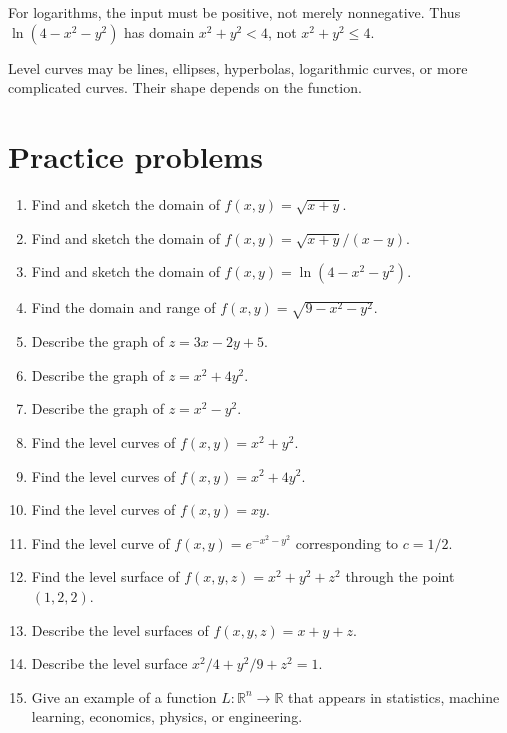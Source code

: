 \documentclass[11pt]{article}
\newcommand{\R}{\mathbb R}
\begin{document}
\begin{warningbox}
For logarithms, the input must be positive, not merely nonnegative. Thus $\ln(4-x^2-y^2)$ has domain $x^2+y^2<4$, not $x^2+y^2\le 4$.
\end{warningbox}

\begin{warningbox}
Level curves may be lines, ellipses, hyperbolas, logarithmic curves, or more complicated curves. Their shape depends on the function.
\end{warningbox}

\section{Practice problems}

\begin{enumerate}
  \item Find and sketch the domain of $f(x,y)=\sqrt{x+y}$.
  \item Find and sketch the domain of $f(x,y)=\sqrt{x+y}/(x-y)$.
  \item Find and sketch the domain of $f(x,y)=\ln(4-x^2-y^2)$.
  \item Find the domain and range of $f(x,y)=\sqrt{9-x^2-y^2}$.
  \item Describe the graph of $z=3x-2y+5$.
  \item Describe the graph of $z=x^2+4y^2$.
  \item Describe the graph of $z=x^2-y^2$.
  \item Find the level curves of $f(x,y)=x^2+y^2$.
  \item Find the level curves of $f(x,y)=x^2+4y^2$.
  \item Find the level curves of $f(x,y)=xy$.
  \item Find the level curve of $f(x,y)=e^{-x^2-y^2}$ corresponding to $c=1/2$.
  \item Find the level surface of $f(x,y,z)=x^2+y^2+z^2$ through the point $(1,2,2)$.
  \item Describe the level surfaces of $f(x,y,z)=x+y+z$.
  \item Describe the level surface $x^2/4+y^2/9+z^2=1$.
  \item Give an example of a function $L:\R^n\to\R$ that appears in statistics, machine learning, economics, physics, or engineering.
\end{enumerate}
\end{document}
